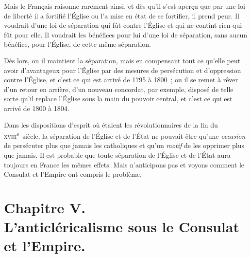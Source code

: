 \documentclass[french,twoside]{book} %
\begin{document}
Mais le Français raisonne rarement ainsi, et dès qu’il s’est aperçu que par une loi de liberté il a fortifié l’Église ou l’a mise en état de se fortifier, il prend peur. Il voudrait d’une loi de séparation qui fût contre l’Église et qui ne contînt rien qui fût pour elle. Il voudrait les bénéfices pour lui d’une loi de séparation, sans aucun bénéfice, pour l’Église, de cette même séparation.\par
 Dès lors, ou il maintient la séparation, mais en compensant tout ce qu’elle peut avoir d’avantageux pour l’Église par des mesures de persécution et d’oppression contre l’Église, et c’est ce qui est arrivé de 1795 à 1800 ; ou il se remet à rêver d’un retour en arrière, d’un nouveau concordat, par exemple, disposé de telle sorte qu’il replace l’Église sous la main du pouvoir central, et c’est ce qui est arrivé de 1800 à 1804.\par
Dans les dispositions d’esprit où étaient les révolutionnaires de la fin du \textsc{xviii}\textsuperscript{e} siècle, la séparation de l’Église et de l’État ne pouvait être qu’une {\itshape occasion} de persécuter plus que jamais les catholiques et qu’un {\itshape motif} de les opprimer plus que jamais. Il est probable que toute séparation de l’Église et de l’État aura toujours en France les mêmes effets. Mais n’anticipons pas et voyons comment le Consulat et l’Empire ont compris le problème.
 \section[{Chapitre V. L’anticléricalisme sous le Consulat et l’Empire.}]{Chapitre V.\\
L’anticléricalisme sous le Consulat et l’Empire.}\renewcommand{\leftmark}{Chapitre V.\\
L’anticléricalisme sous le Consulat et l’Empire.}
\end{document}
